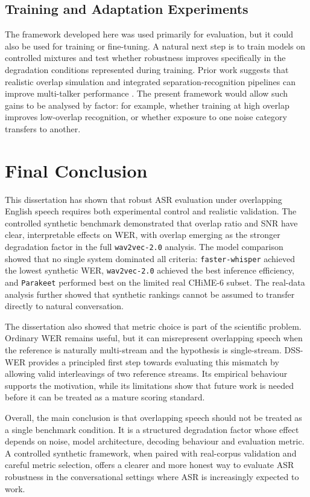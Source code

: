 \subsection{Training and Adaptation Experiments}
The framework developed here was used primarily for evaluation, but it could also be used for training or fine-tuning. A natural next step is to train models on controlled mixtures and test whether robustness improves specifically in the degradation conditions represented during training. Prior work suggests that realistic overlap simulation and integrated separation-recognition pipelines can improve multi-talker performance \citep{yang2022simulatingrealisticspeechoverlaps, raj2020integrationspeechseparationdiarization, chen2020continuousspeechseparationconformer}. The present framework would allow such gains to be analysed by factor: for example, whether training at high overlap improves low-overlap recognition, or whether exposure to one noise category transfers to another.

\section{Final Conclusion}
This dissertation has shown that robust ASR evaluation under overlapping English speech requires both experimental control and realistic validation. The controlled synthetic benchmark demonstrated that overlap ratio and SNR have clear, interpretable effects on WER, with overlap emerging as the stronger degradation factor in the full \texttt{wav2vec-2.0} analysis. The model comparison showed that no single system dominated all criteria: \texttt{faster-whisper} achieved the lowest synthetic WER, \texttt{wav2vec-2.0} achieved the best inference efficiency, and \texttt{Parakeet} performed best on the limited real CHiME-6 subset. The real-data analysis further showed that synthetic rankings cannot be assumed to transfer directly to natural conversation.

The dissertation also showed that metric choice is part of the scientific problem. Ordinary WER remains useful, but it can misrepresent overlapping speech when the reference is naturally multi-stream and the hypothesis is single-stream. DSS-WER provides a principled first step towards evaluating this mismatch by allowing valid interleavings of two reference streams. Its empirical behaviour supports the motivation, while its limitations show that future work is needed before it can be treated as a mature scoring standard.

Overall, the main conclusion is that overlapping speech should not be treated as a single benchmark condition. It is a structured degradation factor whose effect depends on noise, model architecture, decoding behaviour and evaluation metric. A controlled synthetic framework, when paired with real-corpus validation and careful metric selection, offers a clearer and more honest way to evaluate ASR robustness in the conversational settings where ASR is increasingly expected to work.


